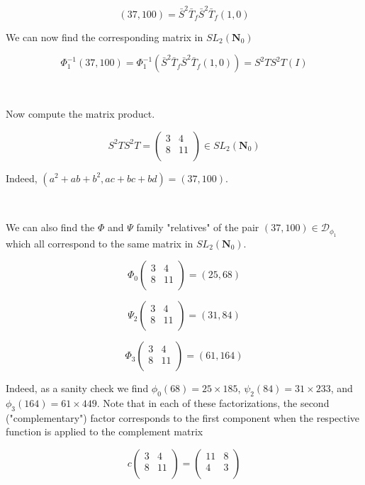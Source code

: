 \documentclass{article}
\begin{document}
$$(37, 100) = \bar{S}^2\bar{T}_f\bar{S}^2\bar{T}_f(1,0)$$

We can now find the corresponding matrix in $SL_2(\mathbf{N}_0)$

$$\Phi_1^{-1}(37, 100)= \Phi_1^{-1}(\bar{S}^2\bar{T}_f\bar{S}^2\bar{T}_f(1,0)) = S^2TS^2T (I)$$

\

Now compute the matrix product.

$$S^2TS^2T = \begin{pmatrix}
    3 & 4 \\
    8 & 11 \\
\end{pmatrix} \in SL_2(\mathbf{N}_0)$$

Indeed, $(a^2 + ab + b^2, ac + bc + bd) = (37, 100)$.

\

We can also find the $\Phi$ and $\Psi$ family "relatives" of the pair $(37,100) \in \mathcal{D}_{\phi_1}$ which all correspond to the same matrix in $SL_2(\mathbf{N}_0)$.

$$ \Phi_0 \begin{pmatrix}
    3 & 4 \\
    8 & 11 \\
\end{pmatrix} = (25, 68)$$


$$ \Psi_2 \begin{pmatrix}
    3 & 4 \\
    8 & 11 \\
\end{pmatrix} = (31, 84)$$


$$\Phi_3 \begin{pmatrix}
    3 & 4 \\
    8 & 11 \\
\end{pmatrix} = (61, 164)$$

Indeed, as a sanity check we find $\phi_0(68) = 25 \times 185$, $\psi_2(84) = 31 \times 233$, and $\phi_3(164) = 61 \times 449$. Note that in each of these factorizations, the second ("complementary") factor corresponds to the first component when the respective function is applied to the complement matrix

$$c \begin{pmatrix}
    3 & 4 \\
    8 & 11 \\
\end{pmatrix} = \begin{pmatrix}
    11 & 8 \\
    4 & 3 \\
\end{pmatrix}$$
\end{document}
